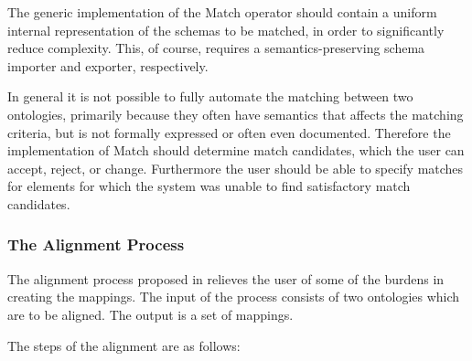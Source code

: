 The generic implementation of the Match operator should contain a
uniform internal representation of the schemas to be matched, in order
to significantly reduce complexity. This, of course, requires a
semantics-preserving schema importer and exporter, respectively. 

In general it is not possible to fully automate the matching between two
ontologies, primarily because they often have semantics that affects
the matching criteria, but is not formally expressed or often even
documented. Therefore the implementation of Match should determine
match candidates, which the user can accept, reject, or change.
Furthermore the user should be able to specify matches for elements for
which the system was unable to find satisfactory match candidates. 

\subsubsection{The Alignment Process}
The alignment process proposed in \cite{debruin2005wsml} relieves the user of
some of the burdens in creating the mappings. The input of the process
consists of two ontologies which are to be aligned. The output is a set
of mappings. 

The steps of the alignment are as follows: 


